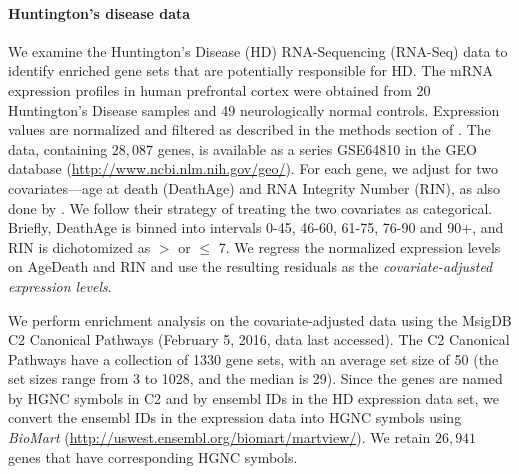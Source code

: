 	\paragraph{Huntington's disease data}
	
	We examine the Huntington's Disease (HD) RNA-Sequencing (RNA-Seq) data 
	\citep{labadorf2015rna}  to
	identify enriched gene sets that are potentially responsible for HD. The mRNA expression 
	profiles in human
	prefrontal cortex were obtained from 20 Huntington's Disease samples and 49 neurologically 
	normal
	controls.  Expression values are normalized and filtered as described in the methods section of
	\citet{labadorf2015rna}. The data, containing $28,087$ genes, is available as a series 
	GSE64810 in the GEO database (\url{http://www.ncbi.nlm.nih.gov/geo/}). 
	For each gene, we adjust for two covariates---age at death (DeathAge) and RNA Integrity 
	Number 
	(RIN), as also done by \citet{labadorf2015rna}. We follow their strategy of treating the two
	covariates as categorical. Briefly, DeathAge is binned into intervals 0-45, 46-60, 61-75, 
	76-90 and
	90+,  and RIN is dichotomized as  $>$ or $\leq$ 7. We regress the normalized expression 
	levels on AgeDeath and RIN and use the resulting residuals as the \textit{covariate-adjusted 
	expression levels}.
	
	We perform enrichment analysis on the covariate-adjusted data using the MsigDB
	\citep{subramanian2005gene} C2 Canonical Pathways (February 5, 2016, data last accessed).
	The C2 Canonical Pathways have a collection of 1330 gene sets, with an average set size of
	50 (the set sizes range from 3 to 1028, and the median is 29). Since the genes are named by
	HGNC symbols in C2 and by ensembl IDs in the HD expression data set, we convert the ensembl 
	IDs in 	the expression data into HGNC symbols using \textit{BioMart}
	(\url{http://uswest.ensembl.org/biomart/martview/}). We retain $26,941$ genes that have
	corresponding HGNC symbols. 
	
	
	
